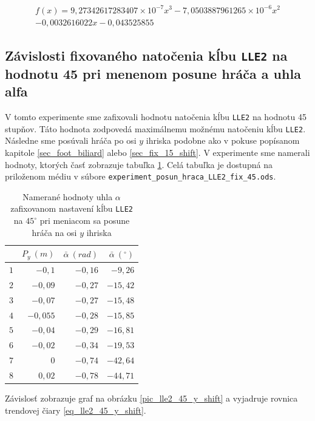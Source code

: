 \begin{eqnarray}  \label{eq_lle2_15_y_shift}
	f(x) = 9,27342617283407\times 10^{-7}x^3 - 7,0503887961265\times 10^{-6}x^2 \\ \nonumber
	- 0,0032616022x - 0,043525855
\end{eqnarray}

\subsection{Závislosti fixovaného natočenia kĺbu \texttt{LLE2} na hodnotu 45 pri menenom posune hráča a uhla alfa} \label{sec_fix_45_shift}

V tomto experimente sme zafixovali hodnotu natočenia kĺbu \texttt{LLE2} na hodnotu 45 stupňov. Táto hodnota zodpovedá maximálnemu možnému natočeniu kĺbu \texttt{LLE2}. Následne sme posúvali hráča po osi $y$ ihriska podobne ako v pokuse popísanom kapitole \ref{sec_foot_biliard} alebo \ref{sec_fix_15_shift}. V experimente sme namerali hodnoty, ktorých časť zobrazuje tabuľka \ref{tab_lle2_45_y_shift}. Celá tabuľka je dostupná na priloženom médiu v súbore \texttt{experiment\_posun\_hraca\_LLE2\_fix\_45.ods}.

\begin{table}[H]
\centering
	\begin{tabular}{|r|r|r|r|}
	\hline
		 & $P_y~(m)$ & $\bar{\alpha}~(rad)$ & $\bar{\alpha}~(^{\circ})$ \\
	\hline
	$1$ & $-0,1$ & $-0,16$ & $-9,26$ \\
	\hline
	$2$ & $-0,09$ & $-0,27$ & $-15,42$ \\
	\hline
	$3$ & $-0,07$ & $-0,27$ & $-15,48$ \\
	\hline
	$4$ & $-0,055$ & $-0,28$ & $-15,85$ \\
	\hline
	$5$ & $-0,04$ & $-0,29$ & $-16,81$ \\
	\hline
	$6$ & $-0,02$ & $-0,34$ & $-19,53$ \\
	\hline
	$7$ & $0$ & $-0,74$ & $-42,64$ \\
	\hline
	$8$ & $0,02$ & $-0,78$ & $-44,71$ \\
	\hline
	\end{tabular}
	\caption{Namerané hodnoty uhla $\alpha$ zafixovanom nastavení kĺbu \texttt{LLE2} na $45^{\circ}$ pri meniacom sa posune hráča na osi $y$ ihriska}
	\label{tab_lle2_45_y_shift}
\end{table}

Závislosť zobrazuje graf na obrázku \ref{pic_lle2_45_y_shift} a vyjadruje rovnica trendovej čiary \ref{eq_lle2_45_y_shift}.

